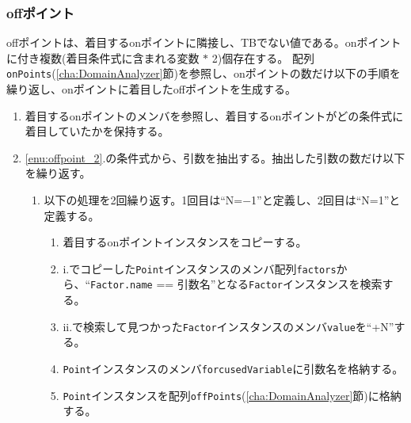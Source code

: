 \documentclass[uplatex, report, a4j, 10pt]{jsbook}
\newcommand\ttt[1]{\texttt{#1}}
\begin{document}
\subsubsection{offポイント}
offポイントは、着目するonポイントに隣接し、TBでない値である。onポイントに付き複数(着目条件式に含まれる変数 $*$ 2)個存在する。
配列\ttt{onPoints}(\ref{cha:DomainAnalyzer}節)を参照し、onポイントの数だけ以下の手順を繰り返し、onポイントに着目したoffポイントを生成する。
\begin{enumerate}
  \item\label{enu:offpoint_2} 着目するonポイントのメンバ\forcusedConditionalExpression{}を参照し、着目するonポイントがどの条件式に着目していたかを保持する。
  \item \ref{enu:offpoint_2}.の条件式から、引数を抽出する。抽出した引数の数だけ以下を繰り返す。
        \begin{enumerate}
          \item 以下の処理を2回繰り返す。1回目は“N=$-$1”と定義し、2回目は“N=1”と定義する。
                \begin{enumerate}
                  \item\label{enu:offpoint_3} 着目するonポイントインスタンスをコピーする。
                  \item\label{enu:offpoint_1} i.でコピーした\ttt{Point}インスタンスのメンバ配列\ttt{factors}から、“\ttt{Factor.name} == 引数名”となる\ttt{Factor}インスタンスを検索する。
                  \item ii.で検索して見つかった\ttt{Factor}インスタンスのメンバ\ttt{value}を“+N”する。
                  \item \ttt{Point}インスタンスのメンバ\ttt{forcusedVariable}に引数名を格納する。
                  \item \ttt{Point}インスタンスを配列\ttt{offPoints}(\ref{cha:DomainAnalyzer}節)に格納する。
                \end{enumerate}
        \end{enumerate}
\end{enumerate}
\end{document}
